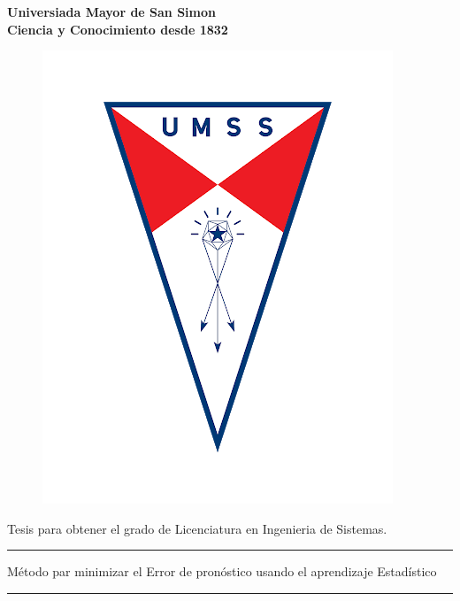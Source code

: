 \begin{titlepage}
	\begin{center}
		{\LARGE \textbf {Universiada Mayor de San Simon}}\\
		\vspace{0.25cm}
		{\large \textbf{Ciencia y Conocimiento desde 1832}}
		\vspace{0.25cm}
		\begin{figure}[h]
			\centering
			\includegraphics[scale=0.25]{imagenes/logo-umss.png}
		\end{figure}
	
		\vspace{1cm}
		
		{\large Tesis para obtener el grado de Licenciatura en Ingenieria de Sistemas.}
		
		\vspace{0.5cm}
		\rule{165mm}{0.5mm}
		\vspace{2mm}
			{\large Método par minimizar el Error de pronóstico usando el aprendizaje Estadístico}
			\vspace{2mm}
		\rule{165mm}{0.5mm}
	\end{center}
\end{titlepage}